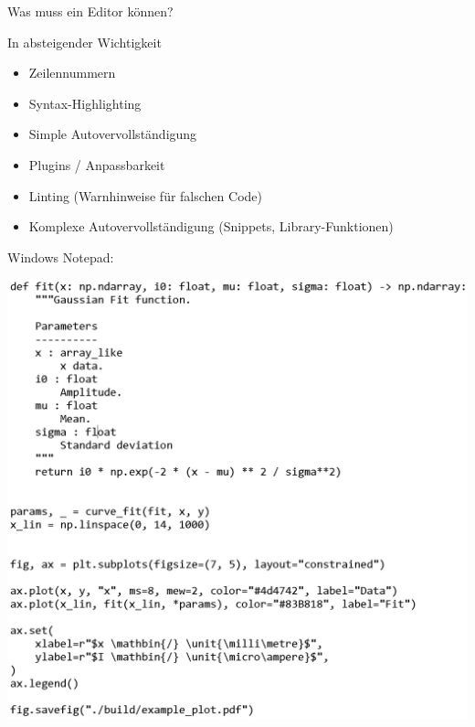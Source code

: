 \begin{frame}{Was muss ein Editor können?}
  \begin{minipage}{0.38\textwidth}
    In absteigender Wichtigkeit

    \begin{itemize}
      \item Zeilennummern
      \item Syntax-Highlighting
      \item Simple Autovervollständigung
      \item Plugins / Anpassbarkeit
      \item Linting (Warnhinweise für falschen Code)
      \item Komplexe Autovervollständigung (Snippets, Library-Funktionen)
    \end{itemize}
    
    \vspace{.4\textheight}
  \end{minipage}
  \pause
  \begin{minipage}{0.268\textwidth}
    Windows Notepad:

    \includegraphics[height=0.51\textheight]{figures/notepad_example_screenshot.png}

    \vspace{.5\textheight}
  \end{minipage}
  \pause
  \begin{minipage}{0.3\textwidth}
    ~
    \vspace{.4\textwidth}


\end{minipage}
\end{frame}
